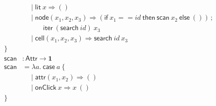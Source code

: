 \documentclass{article}
\newcommand{\mf}[1]{\mathsf{#1}}
\newcommand{\mb}[1]{\mathbf{#1}}
\newcommand{\semi}{\,;\,}
\newcommand{\tone}{\mb{1}}
\newcommand{\vattr}[2]{\mf{attr}(#1, #2)}
\newcommand{\vclick}[1]{\mf{onClick}\ #1}
\newcommand{\eif}[3]{\mf{if}\ #1\ \mf{then}\ #2\ \mf{else}\ #3}
\newcommand{\elit}[1]{\mf{lit}\ #1}
\begin{document}
\begin{align*}
&\quad\mid \elit{x} \Rightarrow ()\\
&\quad\mid \mf{node}(x_1, x_2, x_3) \Rightarrow 
  (\eif{x_1 == id}{\mf{scan}\ x_2}{()})
  \semi\\&\qquad\quad 
  \mf{iter}\ (\mf{search}\ id)\ x_3\\
&\quad\mid \mf{cell}(x_1, x_2, x_3) \Rightarrow \mf{search}\ id\ x_3\\
\}\\
\mf{scan} &: \mf{Attr} \rightarrow \tone\\
\mf{scan} &= \lambda a.\ \mf{case}\ a\ \{\\
  &\quad\mid \vattr{x_1}{x_2} \Rightarrow ()\\
  &\quad\mid \vclick{x} \Rightarrow x\ ()\\
\}
\end{align*}
\end{document}
